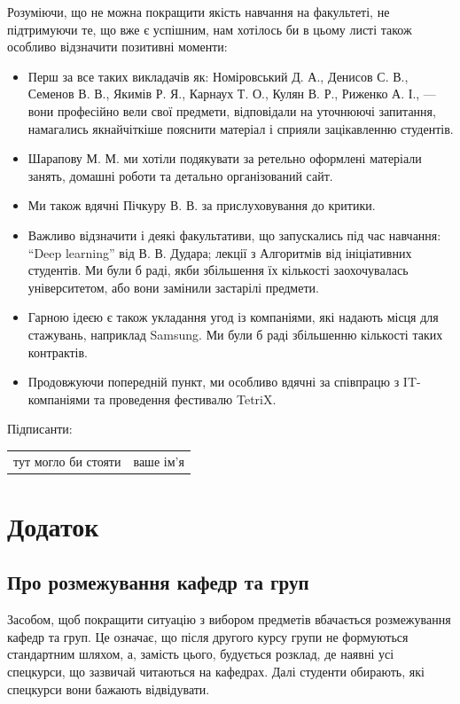 \documentclass[14pt, a4paper]{extarticle}  %
\begin{document}
Розуміючи, що не можна покращити якість навчання на факультеті, не підтримуючи те, що вже є успішним, нам хотілось би в цьому листі також особливо  відзначити позитивні моменти:
\begin{itemize}
    \item Перш за все таких викладачів як: Номіровський Д. А., Денисов С. В., Семенов В. В., Якимів Р. Я., Карнаух Т. О., Кулян В. Р., Риженко А. І., --- вони професійно вели свої предмети, відповідали на уточнюючі запитання, намагались якнайчіткіше пояснити матеріал і сприяли зацікавленню студентів. 

\item Шарапову М. М.  ми хотіли подякувати за ретельно оформлені матеріали занять, домашні роботи та детально організований сайт. 

\item Ми також вдячні Пічкуру В. В. за прислуховування до критики.

\item Важливо відзначити і деякі факультативи, що запускались під час навчання: ``Deep learning'' від В. В. Дудара; лекції з Алгоритмів від ініціативних студентів. Ми були б раді, якби збільшення їх кількості заохочувалась університетом, або вони замінили застарілі предмети.

\item Гарною ідеєю є також укладання угод із компаніями, які надають місця для стажувань, наприклад Samsung. Ми були б раді збільшенню кількості таких контрактів.

\item Продовжуючи попередній пункт, ми особливо вдячні за співпрацю з IT-компаніями та проведення фестивалю TetriX. 
\end{itemize}

\newpage
Підписанти:

\begin{tabular}{c|c}
\hline
тут могло би стояти & ваше ім'я \\
\end{tabular}


\newpage\section{Додаток}
\subsection{Про розмежування кафедр та груп}
\label{cathedra_demarcation}
Засобом, щоб покращити ситуацію з вибором предметів вбачається розмежування кафедр та груп. Це означає, що після другого курсу групи не формуються стандартним шляхом, а, замість цього, будується розклад, де наявні усі спецкурси, що зазвичай читаються на кафедрах. Далі студенти обирають, які спецкурси вони бажають відвідувати.
\end{document}
